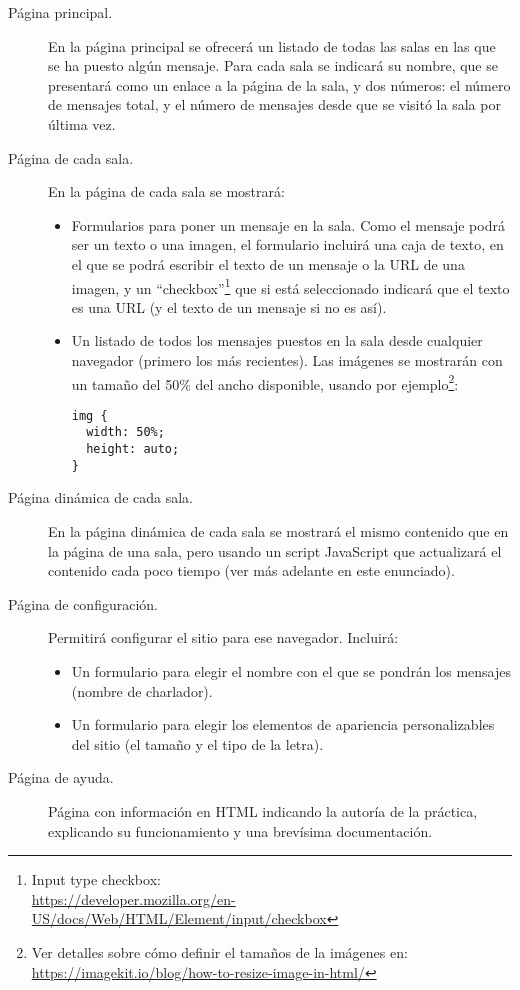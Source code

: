 \begin{description}
\item[Página principal.] En la página principal se ofrecerá un listado de todas las salas en las que se ha puesto algún mensaje. Para cada sala se indicará su nombre, que se presentará como un enlace a la página de la sala, y dos números: el número de mensajes total, y el número de mensajes desde que se visitó la sala por última vez.
\item[Página de cada sala.] En la página de cada sala se mostrará:
  \begin{itemize}
  \item Formularios para poner un mensaje en la sala. Como el mensaje podrá ser un texto o una imagen, el formulario incluirá una caja de texto, en el que se podrá escribir el texto de un mensaje o la URL de una imagen, y un ``checkbox''\footnote{Input type checkbox: \\ \url{https://developer.mozilla.org/en-US/docs/Web/HTML/Element/input/checkbox}} que si está seleccionado indicará que el texto es una URL (y el texto de un mensaje si no es así).
  \item Un listado de todos los mensajes puestos en la sala desde cualquier navegador (primero los más recientes). Las imágenes se mostrarán con un tamaño del 50\% del ancho disponible, usando por ejemplo\footnote{Ver detalles sobre cómo definir el tamaños de la imágenes en: \\ \url{https://imagekit.io/blog/how-to-resize-image-in-html/}}:

\begin{verbatim}
img {
  width: 50%;
  height: auto;
}
\end{verbatim}

  \end{itemize}

\item[Página dinámica de cada sala.] En la página dinámica de cada sala se mostrará el mismo contenido que en la página de una sala, pero usando un script JavaScript que actualizará el contenido cada poco tiempo (ver más adelante en este enunciado).
\item[Página de configuración.] Permitirá configurar el sitio para ese navegador. Incluirá:
  \begin{itemize}
  \item Un formulario para elegir el nombre con el que se pondrán los mensajes (nombre de charlador).
  \item Un formulario para elegir los elementos de apariencia personalizables del sitio (el tamaño y el tipo de la letra).
  \end{itemize}
\item[Página de ayuda.] Página con información en HTML indicando la autoría de la práctica, explicando su funcionamiento y una brevísima documentación.
\end{description}

